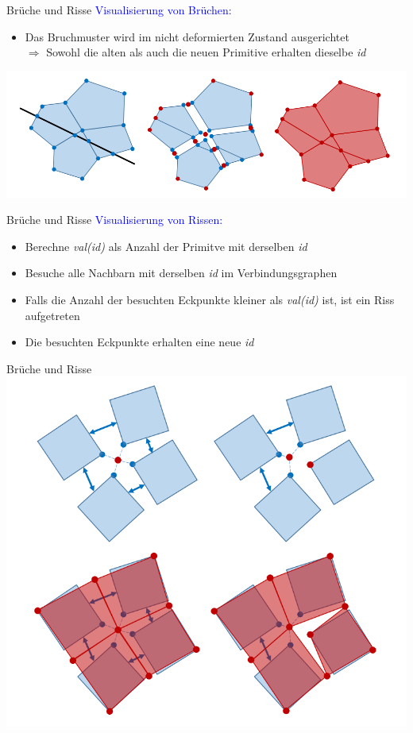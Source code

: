 \documentclass[t]{beamer}
\begin{document}
	\begin{frame}{Brüche und Risse}
		\textcolor{blue}{Visualisierung von Brüchen:}
		\begin{itemize}
			\item Das Bruchmuster wird im nicht deformierten Zustand ausgerichtet\\
				$\Rightarrow$ Sowohl die alten als auch die neuen Primitive erhalten dieselbe \textit{id}
		\end{itemize}
		\begin{center}
			\includegraphics[scale = 0.4]{Fracture.png}
		\end{center}
	\end{frame}
	
	\begin{frame}{Brüche und Risse}
		\textcolor{blue}{Visualisierung von Rissen:}
		\begin{itemize}
			\item Berechne \textit{val(id)} als Anzahl der Primitve mit derselben \textit{id}
			\item Besuche alle Nachbarn mit derselben \textit{id} im Verbindungsgraphen
			\item Falls die Anzahl der besuchten Eckpunkte kleiner als \textit{val(id)} ist, ist ein Riss aufgetreten
			\item Die besuchten Eckpunkte erhalten eine neue \textit{id}
		\end{itemize}
	\end{frame}

	\begin{frame}{Brüche und Risse}
		\centering
		\includegraphics[scale = 0.35]{Tearing.png}
	\end{frame}
	
\end{document}
